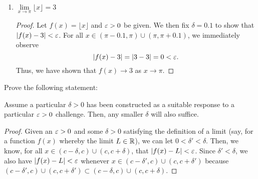 \begin{problem}
\begin{enumerate}[label=(\alph*)]
\begin{proof}
\begin{itemize}
              The last inequality holds because $\abs{x^{2} + 2x + 4} < 19$ for all
              $x$ such that $0 < \abs{x - 2} < \delta \leq 1$.
              (We leverage this fact for the second case as well.)

            \item When $\eps > 19$, then $\delta = 1$. Then, for all $x$
              such that $0 < \abs{x - 2} < 1$, it follows that
              \begin{align*}
                \abs{f(x) - 8} &= \\
                \abs{(x-2)(x^{2} +2x + 4)} &= \\
                \abs{x-2} \abs{x^{2} + 2x + 4} &< \abs{x^{2} + 2x + 4} \\ 
                                               &\leq 19 \\ 
                                               &< \eps.
              \end{align*}
        \end{itemize}
        Thus, we have shown that $f(x) \to 8$ as $x \to 2$. 
      \end{proof}

    \item $\lim\limits_{x \to \pi} \lfloor x \rfloor = 3$ 
      \begin{proof}
        Let $f(x) = \lfloor x \rfloor$ and $\varepsilon > 0$ be given. We then fix $\delta = 0.1$ to show
        that $\left\lvert f(x) - 3 \right\rvert < \varepsilon$. For all $x \in (\pi - 0.1, \pi) \cup (\pi, \pi + 0.1)$, we immediately observe
        \[
          \left\lvert f(x) - 3 \right\rvert = \left\lvert 3 - 3 \right\rvert = 0 < \varepsilon.
        \]
        Thus, we have shown that $f(x) \to 3$ as $x \to \pi$.
      \end{proof}

  \end{enumerate}
\end{problem}


\begin{problem}
  \label{prob:smaller-delta-sufficient}
  Prove the following statement:
    \begin{displayquote}
      Assume a particular $\delta > 0$ has been constructed as a suitable response to
      a particular $\varepsilon > 0$ challenge. Then, any smaller $\delta$ will also suffice.
    \end{displayquote}

  \begin{proof}
    Given an $\varepsilon > 0$ and some $\delta > 0$ satisfying the definition of a
    limit (say, for a function $f(x)$ whereby the limit $L \in \mathbb{R}$), we can let
    $0 < \delta' < \delta$. Then, we know, for all $x \in (c - \delta, c) \cup (c, c + \delta)$, that
    $\left\lvert f(x) - L \right\rvert < \varepsilon$. Since $\delta' < \delta$, we also have $\left\lvert f(x) - L \right\rvert < \varepsilon$ whenever
    $x \in (c - \delta', c) \cup (c, c + \delta')$ because 
    $(c - \delta', c) \cup (c, c + \delta') \subset (c - \delta, c) \cup (c, c + \delta)$.
  \end{proof}
\end{problem}


